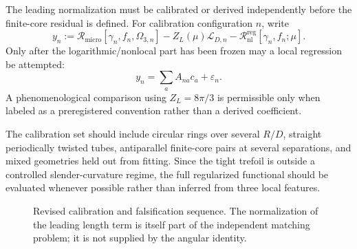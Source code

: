 \documentclass[aps,pre,preprint,notitlepage,nofootinbib,superscriptaddress]{revtex4-2}
\newcommand{\calL}{\mathcal L}
\newcommand{\Rmicro}{\mathscr R_{\mathrm{micro}}}
\newcommand{\ZL}{Z_L}
\newcommand{\Rnl}{\mathscr R_{\mathrm{nl}}^{\mathrm{reg}}}
\begin{document}
The leading normalization must be calibrated or derived independently before the finite-core residual is defined.  For calibration configuration $n$, write
\begin{equation}
  y_n:=\Rmicro[\gamma_n,f_n,\Omega_{3,n}]
      -\ZL(\mu)\calL_{D,n}
      -\Rnl[\gamma_n,f_n;\mu].
  \label{eq:calibration-v020}
\end{equation}
Only after the logarithmic/nonlocal part has been frozen may a local regression be attempted:
\begin{equation}
  y_n=\sum_aA_{na}c_a+\varepsilon_n.
\end{equation}
A phenomenological comparison using $\ZL=8\pi/3$ is permissible only when labeled as a preregistered convention rather than a derived coefficient.

The calibration set should include circular rings over several $R/D$, straight periodically twisted tubes, antiparallel finite-core pairs at several separations, and mixed geometries held out from fitting.  Since the tight trefoil is outside a controlled slender-curvature regime, the full regularized functional should be evaluated whenever possible rather than inferred from three local features.


\begin{figure}[t]
\centering
{}
\caption{Revised calibration and falsification sequence.  The normalization of the leading length term is itself part of the independent matching problem; it is not supplied by the angular identity.}
\label{fig:calibration-v020}
\end{figure}
\end{document}

